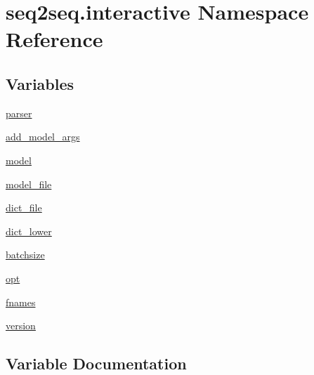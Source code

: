 \hypertarget{namespaceseq2seq_1_1interactive}{}\section{seq2seq.\+interactive Namespace Reference}
\label{namespaceseq2seq_1_1interactive}
\subsection*{Variables}
\begin{DoxyCompactItemize}
\item 
\hyperlink{namespaceseq2seq_1_1interactive_a30c7c17d3501869dc954ba79b1bb1703}{parser}
\item 
\hyperlink{namespaceseq2seq_1_1interactive_aec2c50a53ca35f8f5f1432d9feb2d678}{add\+\_\+model\+\_\+args}
\item 
\hyperlink{namespaceseq2seq_1_1interactive_a22e0b789d68f198e7dbf8134db94fb71}{model}
\item 
\hyperlink{namespaceseq2seq_1_1interactive_a94386ae1e7e78ebdee68773a101d7706}{model\+\_\+file}
\item 
\hyperlink{namespaceseq2seq_1_1interactive_a0f5b8bb9f14ec40ff88586a81daca1cd}{dict\+\_\+file}
\item 
\hyperlink{namespaceseq2seq_1_1interactive_a52b9426742f4f10a787e41539194123c}{dict\+\_\+lower}
\item 
\hyperlink{namespaceseq2seq_1_1interactive_a9a9ffa86966f79dad851a9485b33f298}{batchsize}
\item 
\hyperlink{namespaceseq2seq_1_1interactive_a6a0cb415a1fef0f71edba01a96d53dba}{opt}
\item 
\hyperlink{namespaceseq2seq_1_1interactive_ae4bce1ba727d000850c523634c304917}{fnames}
\item 
\hyperlink{namespaceseq2seq_1_1interactive_ae79ed748b505aa1b31aab802d43545df}{version}
\end{DoxyCompactItemize}


\subsection{Variable Documentation}
\mbox{\label{namespaceseq2seq_1_1interactive_aec2c50a53ca35f8f5f1432d9feb2d678}} 
